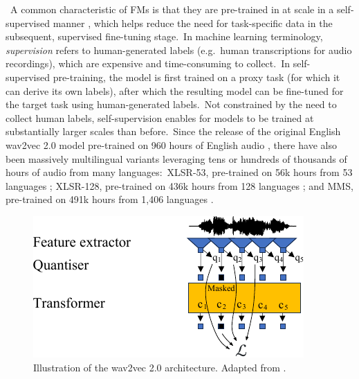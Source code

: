 \documentclass[main.tex]{subfiles}
\begin{document}
~A common characteristic of FMs is that they are pre-trained in at scale in a self-supervised manner \parencite{bommasani2021opportunities}, which helps reduce the need for task-specific data in the subsequent, supervised fine-tuning stage.~In machine learning terminology, \emph{supervision} refers to human-generated labels (e.g.~human transcriptions for audio recordings), which are expensive and time-consuming to collect.~In self-supervised pre-training, the model is first trained on a proxy task (for which it can derive its own labels), after which the resulting model can be fine-tuned for the target task using human-generated labels.~Not constrained by the need to collect human labels, self-supervision enables for models to be trained at substantially larger scales than before.~Since the release of the original English wav2vec 2.0 model pre-trained on 960 hours of English audio \parencite{NEURIPS2020_92d1e1eb}, there have also been massively multilingual variants leveraging tens or hundreds of thousands of hours of audio from many languages:~XLSR-53, pre-trained on 56k hours from 53 languages \parencite{conneau2020unsupervised}; XLSR-128, pre-trained on 436k hours from 128 languages \parencite{babu2021xls}; and MMS, pre-trained on 491k hours from 1,406 languages \parencite{pratap2023scaling}.

\begin{figure}[t]
\centering
  \includegraphics[width=0.45\linewidth]{figures/w2v2-intro}
  \caption[Illustration of the wav2vec 2.0 architecture.]{Illustration of the wav2vec 2.0 architecture. Adapted from \textcite{NEURIPS2020_92d1e1eb}.}
  \label{fig:intro-w2v2}
\end{figure}
\end{document}
